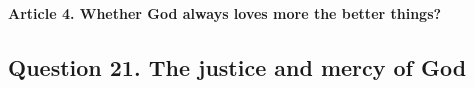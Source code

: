 \documentclass{ucetd}
\begin{document}
\paragraph{Article 4. Whether God always loves more the better things?}
\subsection{Question 21. The justice and mercy of God}
\end{document}
